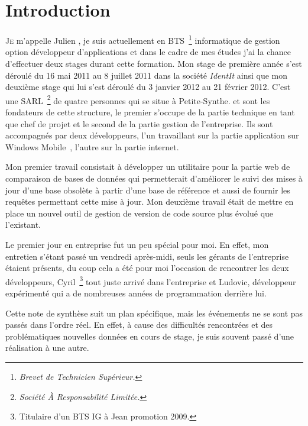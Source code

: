 \chapter{Introduction} %
\label{cha:Introduction}

\lettrine{J}{e} m'appelle Julien , je suis actuellement en
BTS\, \footnote{\emph{Brevet de Technicien Supérieur.}} informatique de
gestion option développeur d'applications et dans le cadre de mes études
j'ai la chance d'effectuer deux stages durant cette formation. Mon stage
de première année s'est déroulé du 16 mai 2011 au 8 juillet 2011 dans la
société \emph{IdentIt} ainsi que mon deuxième stage qui lui s'est
déroulé du 3 janvier 2012 au 21 février 2012. C'est une SARL\,
\footnote{\emph{Société À Responsabilité Limitée.}} de quatre personnes
qui se situe à Petite-Synthe.   et  sont
les fondateurs de cette structure, le premier s'occupe de la partie
technique en tant que chef de projet et le second de la partie gestion
de l'entreprise. Ils sont accompagnés par deux développeurs, l'un
travaillant sur la partie application sur Windows
Mobile~\textregistered, l'autre sur la partie internet.

Mon premier travail consistait à développer un utilitaire pour la partie
web de comparaison de bases de données qui permetterait d'améliorer le
suivi des mises à jour d'une base obsolète à partir d'une base de
référence et aussi de fournir les requêtes permettant cette mise à jour.
Mon deuxième travail était de mettre en place un nouvel outil de gestion
de version de code source plus évolué que l'existant.

Le premier jour en entreprise fut un peu spécial pour moi. En effet, mon
entretien s'étant passé un vendredi après-midi, seuls les gérants de
l'entreprise étaient présents, du coup cela a été pour moi l'occasion de
rencontrer les deux développeurs, Cyril\, \footnote{Titulaire d'un BTS
IG à Jean  promotion 2009.} tout juste arrivé dans
l'entreprise et Ludovic, développeur expérimenté qui a de nombreuses
années de programmation derrière lui.

Cette note de synthèse suit un plan spécifique, mais les événements ne
se sont pas passés dans l'ordre réel. En effet, à cause des difficultés
rencontrées et des problématiques nouvelles données en cours de stage,
je suis souvent passé d'une réalisation à une autre.
